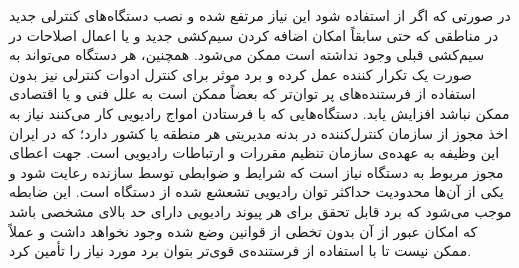 
در صورتی که اگر از  استفاده شود این نیاز مرتفع شده و نصب دستگاه‌های کنترلی جدید در مناطقی که حتی سابقاً امکان اضافه کردن سیم‌کشی جدید و یا اعمال اصلاحات در سیم‌کشی قبلی وجود نداشته است ممکن می‌شود. همچنین، هر دستگاه می‌تواند به صورت یک تکرار کننده عمل کرده و برد موثر برای کنترل ادوات کنترلی نیز بدون استفاده از فرستنده‌های پر توان‌تر که بعضاً ممکن است به علل فنی و یا اقتصادی ممکن نباشد افزایش یابد. دستگاه‌هایی که با فرستادن امواج رادیویی کار می‌کنند نیاز به اخذ مجوز از سازمان کنترل‌کننده در بدنه مدیریتی هر منطقه یا کشور دارد؛ که در ایران این وظیفه به عهده‌ی سازمان تنظیم مقررات و ارتباطات رادیویی است. جهت اعطای مجوز مربوط به دستگاه نیاز است که شرایط و ضوابطی توسط سازنده رعایت شود و یکی از آن‌ها محدودیت حداکثر توان رادیویی تشعشع شده از دستگاه است. این ضابطه موجب می‌شود که برد قابل تحقق برای هر پیوند رادیویی دارای حد بالای مشخصی باشد که امکان عبور از آن بدون تخطی از قوانین وضع شده وجود نخواهد داشت و عملاً ممکن نیست تا با استفاده از فرستنده‌ی قوی‌تر بتوان برد مورد نیاز را تأمین کرد.
